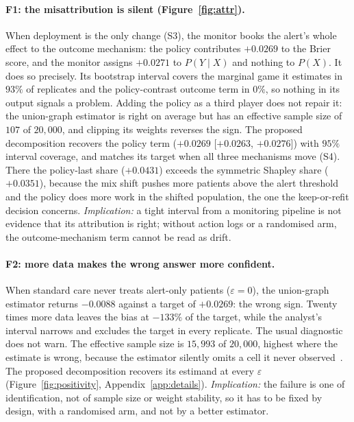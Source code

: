 \documentclass[letterpaper]{article} %
\begin{document}
\paragraph{F1: the misattribution is silent (Figure~\ref{fig:attr}).} When
deployment is the only change (S3), the monitor books the alert's whole effect
to the outcome mechanism: the policy contributes $+0.0269$ to the Brier score,
and the monitor assigns $+0.0271$ to $P(Y \mid X)$ and nothing to $P(X)$. It
does so precisely. Its bootstrap interval covers the marginal game it
estimates in $93\%$ of replicates and the policy-contrast outcome term in
$0\%$, so nothing in its output signals a problem. Adding the policy as a
third player does not repair it: the union-graph estimator is right on average
but has an effective sample size of $107$ of $20{,}000$, and clipping its
weights reverses the sign. The proposed decomposition recovers the policy term
($+0.0269$ [$+0.0263$, $+0.0276$]) with $95\%$ interval coverage, and matches
its target when all three mechanisms move (S4). There the policy-last share
($+0.0431$) exceeds
the symmetric Shapley share ($+0.0351$), because the mix shift pushes more
patients above the alert threshold and the policy does more work in the
shifted population, the one the keep-or-refit decision concerns.
\emph{Implication:} a tight interval from a monitoring pipeline is not
evidence that its attribution is right; without action logs or a randomised
arm, the outcome-mechanism term cannot be read as drift.

\paragraph{F2: more data makes the wrong answer more confident.} When
standard care never treats alert-only patients ($\varepsilon = 0$), the
union-graph estimator returns $-0.0088$ against a target of $+0.0269$: the
wrong sign. Twenty times more data leaves the bias at $-133\%$ of the target,
while the analyst's interval narrows and excludes the target in every
replicate. The usual diagnostic does not warn. The effective sample size is
$15{,}993$ of $20{,}000$, highest where the estimate is wrong, because the
estimator silently omits a cell it never observed~\citep{petersen2012positivity}.
The proposed decomposition recovers its estimand at every $\varepsilon$
(Figure~\ref{fig:positivity}, Appendix~\ref{app:details}).
\emph{Implication:} the failure is one of identification, not of sample size
or weight stability, so it has to be fixed by design, with a randomised arm,
and not by a better estimator.
\end{document}
